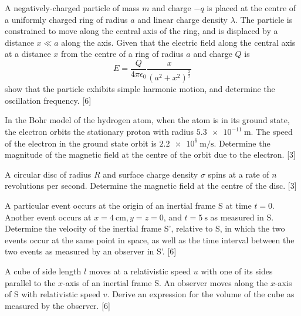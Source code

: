 \begin{problem}
    \begin{subproblem}
        A negatively-charged particle of mass $m$ and charge $-q$ is placed at the centre of a uniformly charged ring of radius $a$ and linear charge density $\lambda$. The particle is constrained to move along the central axis of the ring, and is displaced by a distance $x\ll a$ along the axis. Given that the electric field along the central axis at a distance $x$ from the centre of a ring of radius $a$ and charge $Q$ is
        \[E=\frac{Q}{4 \pi \epsilon_{0}} \frac{x}{\left(a^{2}+x^{2}\right)^{\frac{3}{2}}}\]
        show that the particle exhibits simple harmonic motion, and determine the oscillation frequency.
    \hfill{[6]}\end{subproblem}
    \begin{subproblem}
        In the Bohr model of the hydrogen atom, when the atom is in its ground state, the electron orbits the stationary proton with radius $\qty{5.3e-11}{\m}$. The speed of the electron in the ground state orbit is $\qty{2.2e6}{\m\per\s}$. Determine the magnitude of the magnetic field at the centre of the orbit due to the electron.
    \hfill{[3]}\end{subproblem}
    \begin{subproblem}
        A circular disc of radius $R$ and surface charge density $\sigma$ spins at a rate of $n$ revolutions per second. Determine the magnetic field at the centre of the disc.
    \hfill{[3]}\end{subproblem}
\end{problem}

\begin{problem}
    \begin{subproblem}
        A particular event occurs at the origin of an inertial frame S at time $t=0$. Another event occurs at $x=\qty{4}{\cm}, y=z=0$, and $t=\qty{5}{\s}$ as measured in $\mathrm{S} .$ Determine the velocity of the inertial frame S', relative to S, in which the two events occur at the same point in space, as well as the time interval between the two events as measured by an observer in S'.
    \hfill{[6]}\end{subproblem}
    \begin{subproblem}
        A cube of side length $l$ moves at a relativistic speed $u$ with one of its sides parallel to the $x$-axis of an inertial frame S. An observer moves along the $x$-axis of S with relativistic speed $v$. Derive an expression for the volume of the cube as measured by the observer.
    \hfill{[6]}\end{subproblem}
\end{problem}